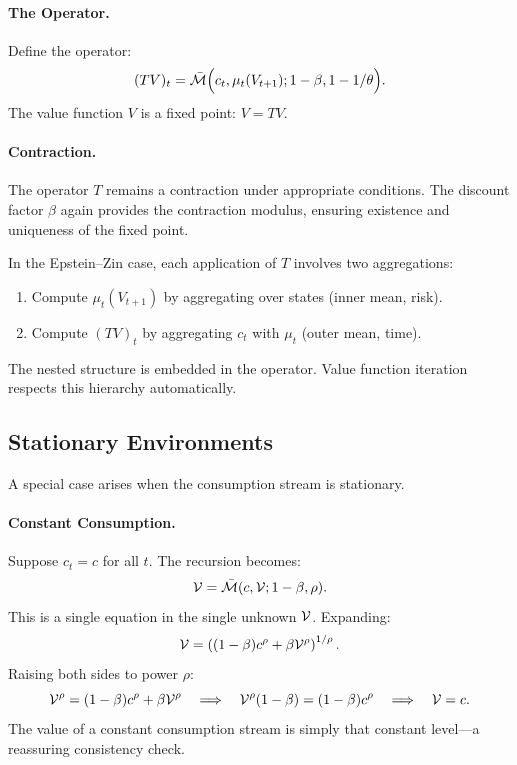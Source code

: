\paragraph{The Operator.}
Define the operator:
\begin{equation}
(TV)_t = \bar{\mathcal{M}}\Big( c_t, \mu_t(V_{t+1}); 1-\beta, 1-1/\theta \Big).
\label{eq:ez-operator}
\end{equation}
The value function $V$ is a fixed point: $V = TV$.

\paragraph{Contraction.}
The operator $T$ remains a contraction under appropriate conditions. The discount factor $\beta$ again provides the contraction modulus, ensuring existence and uniqueness of the fixed point.

\begin{calloutnote}
In the Epstein--Zin case, each application of $T$ involves two aggregations:
\begin{enumerate}[leftmargin=1.5em]
    \item Compute $\mu_t(V_{t+1})$ by aggregating over states (inner mean, risk).
    \item Compute $(TV)_t$ by aggregating $c_t$ with $\mu_t$ (outer mean, time).
\end{enumerate}
The nested structure is embedded in the operator. Value function iteration respects this hierarchy automatically.
\end{calloutnote}

\subsection{Stationary Environments}
\label{subsec:stationary}

A special case arises when the consumption stream is stationary.

\paragraph{Constant Consumption.}
Suppose $c_t = c$ for all $t$. The recursion becomes:
\begin{equation}
\mathcal{V} = \bar{\mathcal{M}}(c, \mathcal{V}; 1-\beta, \rho).
\label{eq:stationary-recursion}
\end{equation}
This is a single equation in the single unknown $\mathcal{V}$. Expanding:
\begin{equation}
\mathcal{V} = \left( (1-\beta) c^\rho + \beta \mathcal{V}^\rho \right)^{1/\rho}.
\label{eq:stationary-expanded}
\end{equation}
Raising both sides to power $\rho$:
\begin{equation}
\mathcal{V}^\rho = (1-\beta) c^\rho + \beta \mathcal{V}^\rho \quad \Longrightarrow \quad \mathcal{V}^\rho (1-\beta) = (1-\beta) c^\rho \quad \Longrightarrow \quad \mathcal{V} = c.
\label{eq:stationary-solution}
\end{equation}
The value of a constant consumption stream is simply that constant level---a reassuring consistency check.


